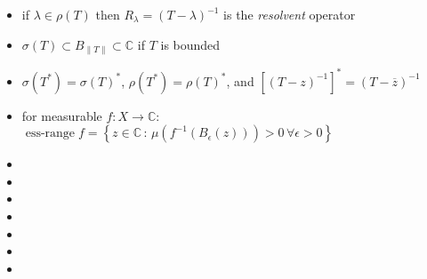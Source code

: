 \documentclass[12pt]{article}
\newcommand{\CC}{\mathbb{C}}
\newcommand{\eps}{\epsilon}
\begin{document}
\begin{itemize}[leftmargin=10mm,itemsep=0mm]
\item[\df{67}] if $\lambda\in\rho(T)$ then $R_\lambda = (T-\lambda)^{-1}$ is the \emph{resolvent} operator
\item[\ft{69}] $\sigma(T) \subset B_{\|T\|} \subset \CC$ if $T$ is bounded
\item[\ft{69}] $\sigma(T^*) = \sigma(T)^*$, $\rho(T^*)=\rho(T)^*$, and $\left[(T-z)^{-1}\right]^* = \left(T-\overline{z}\right)^{-1}$
\item[\df{71}] for measurable $f:X\to\CC$:\, $\operatorname{ess-range} f = \left\{z\in\CC\,:\,\mu(f^{-1}(B_\eps(z))) > 0 \, \forall \eps>0\right\}$
\item[\ft{}] 
\item[\df{}] 
\item[\df{}] 
\item[\df{}] 
\item[\df{}] 
\item[\df{}] 
\item[\ft{}] 
\end{itemize}
\end{document}
